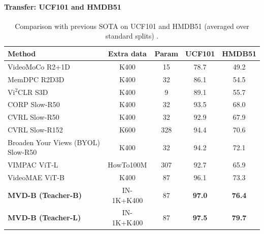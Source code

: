 \begin{enrichment}
\begin{enrichment}
            \paragraph{Transfer: UCF101 and HMDB51}
            \begin{table}[H]
                \centering
                \small
                \setlength{\tabcolsep}{8pt}
                \caption{Comparison with previous SOTA on UCF101 and HMDB51 (averaged over standard splits) \cite{wang2023_mvd,pan2021_videomoco,han2020_memdpc,chen2021_corp,qian2021_cvrl,recasens2021_broaden,tan2021_vimpac,tong2022_videomae}.}
                \label{tab:chapter24_mvd_ucf_hmdb}
                \begin{tabular}{lcccc}
                    \toprule
                    \textbf{Method} & \textbf{Extra data} & \textbf{Param} & \textbf{UCF101} & \textbf{HMDB51} \\
                    \midrule
                    VideoMoCo R2{+}1D \cite{pan2021_videomoco} & K400 & 15 & 78.7 & 49.2 \\
                    MemDPC R2D3D \cite{han2020_memdpc} & K400 & 32 & 86.1 & 54.5 \\
                    Vi$^2$CLR S3D \cite{qian2021_cvrl} & K400 & 9 & 89.1 & 55.7 \\
                    CORP Slow-R50 \cite{chen2021_corp} & K400 & 32 & 93.5 & 68.0 \\
                    CVRL Slow-R50 \cite{qian2021_cvrl} & K400 & 32 & 92.9 & 67.9 \\
                    CVRL Slow-R152 \cite{qian2021_cvrl} & K600 & 328 & 94.4 & 70.6 \\
                    Broaden Your Views (BYOL) Slow-R50 \cite{recasens2021_broaden} & K400 & 32 & 94.2 & 72.1 \\
                    VIMPAC ViT-L \cite{tan2021_vimpac} & HowTo100M & 307 & 92.7 & 65.9 \\
                    VideoMAE ViT-B \cite{tong2022_videomae} & K400 & 87 & 96.1 & 73.3 \\
                    \textbf{MVD-B (Teacher-B)} \cite{wang2023_mvd} & IN-1K+K400 & 87 & \textbf{97.0} & \textbf{76.4} \\
                    \textbf{MVD-B (Teacher-L)} \cite{wang2023_mvd} & IN-1K+K400 & 87 & \textbf{97.5} & \textbf{79.7} \\
                    \bottomrule
                \end{tabular}
            \end{table}
            

\end{enrichment}
\end{enrichment}
